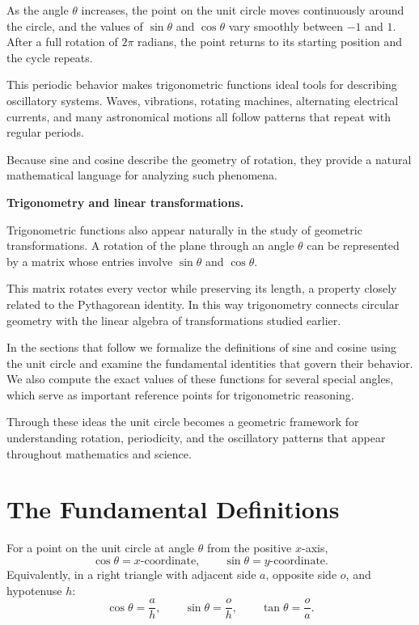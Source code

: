 \documentclass[11pt, openany]{book}
\theoremstyle{plain}
\theoremstyle{definition}
\theoremstyle{remark}
\begin{document}
As the angle $\theta$ increases, the point on the unit circle moves
continuously around the circle, and the values of $\sin\theta$ and
$\cos\theta$ vary smoothly between $-1$ and $1$. After a full rotation of
$2\pi$ radians, the point returns to its starting position and the cycle
repeats.

This periodic behavior makes trigonometric functions ideal tools for
describing oscillatory systems. Waves, vibrations, rotating machines,
alternating electrical currents, and many astronomical motions all
follow patterns that repeat with regular periods.

Because sine and cosine describe the geometry of rotation, they provide
a natural mathematical language for analyzing such phenomena.

\medskip

\textbf{Trigonometry and linear transformations.}

Trigonometric functions also appear naturally in the study of geometric
transformations. A rotation of the plane through an angle $\theta$ can be
represented by a matrix whose entries involve $\sin\theta$ and
$\cos\theta$.

This matrix rotates every vector while preserving its length, a property
closely related to the Pythagorean identity. In this way trigonometry
connects circular geometry with the linear algebra of transformations
studied earlier.

\medskip

In the sections that follow we formalize the definitions of sine and
cosine using the unit circle and examine the fundamental identities that
govern their behavior. We also compute the exact values of these
functions for several special angles, which serve as important reference
points for trigonometric reasoning.

Through these ideas the unit circle becomes a geometric framework for
understanding rotation, periodicity, and the oscillatory patterns that
appear throughout mathematics and science.

\section{The Fundamental Definitions}

\begin{mydefinition}
For a point on the unit circle at angle $\theta$ from the positive $x$-axis,
\[
  \cos\theta = x\text{-coordinate},\qquad
  \sin\theta = y\text{-coordinate}.
\]
Equivalently, in a right triangle with adjacent side $a$, opposite
side $o$, and hypotenuse $h$:
\[
  \cos\theta=\frac{a}{h},\qquad\sin\theta=\frac{o}{h},\qquad\tan\theta=\frac{o}{a}.
\]
\end{mydefinition}
\end{document}
